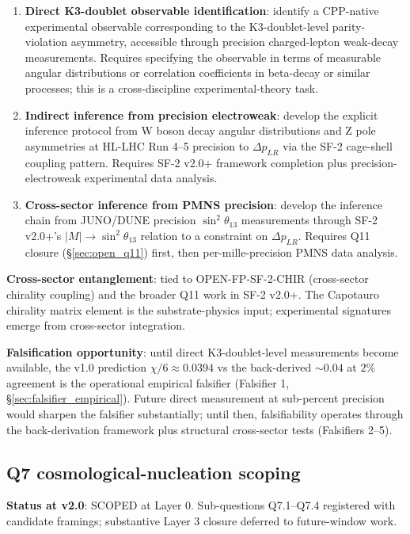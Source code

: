 \documentclass[11pt,letterpaper]{article}
\newcommand{\DeltapLR}{\Delta p_{LR}}
\begin{document}
\begin{enumerate}\setlength\itemsep{0.2em}
    \item \textbf{Direct K3-doublet observable identification}: identify a CPP-native experimental observable corresponding to the K3-doublet-level parity-violation asymmetry, accessible through precision charged-lepton weak-decay measurements. Requires specifying the observable in terms of measurable angular distributions or correlation coefficients in beta-decay or similar processes; this is a cross-discipline experimental-theory task.
    \item \textbf{Indirect inference from precision electroweak}: develop the explicit inference protocol from W boson decay angular distributions and Z pole asymmetries at HL-LHC Run 4--5 precision to $\DeltapLR$ via the SF-2 cage-shell coupling pattern. Requires SF-2 v2.0+ framework completion plus precision-electroweak experimental data analysis.
    \item \textbf{Cross-sector inference from PMNS precision}: develop the inference chain from JUNO/DUNE precision $\sin^2\theta_{13}$ measurements through SF-2 v2.0+'s $|M| \to \sin^2\theta_{13}$ relation to a constraint on $\DeltapLR$. Requires Q11 closure (\S\ref{sec:open_q11}) first, then per-mille-precision PMNS data analysis.
\end{enumerate}

\textbf{Cross-sector entanglement}: tied to OPEN-FP-SF-2-CHIR (cross-sector chirality coupling) and the broader Q11 work in SF-2 v2.0+. The Capotauro chirality matrix element is the substrate-physics input; experimental signatures emerge from cross-sector integration.

\textbf{Falsification opportunity}: until direct K3-doublet-level measurements become available, the v1.0 prediction $\chi/6 \approx 0.0394$ vs the back-derived $\sim 0.04$ at $2\%$ agreement is the operational empirical falsifier (Falsifier 1, \S\ref{sec:falsifier_empirical}). Future direct measurement at sub-percent precision would sharpen the falsifier substantially; until then, falsifiability operates through the back-derivation framework plus structural cross-sector tests (Falsifiers 2--5).

\subsection{Q7 cosmological-nucleation scoping}\label{sec:open_q7_cosmological_nucleation}

\textbf{Status at v2.0}: SCOPED at Layer 0. Sub-questions Q7.1--Q7.4 registered with candidate framings; substantive Layer 3 closure deferred to future-window work.
\end{document}
